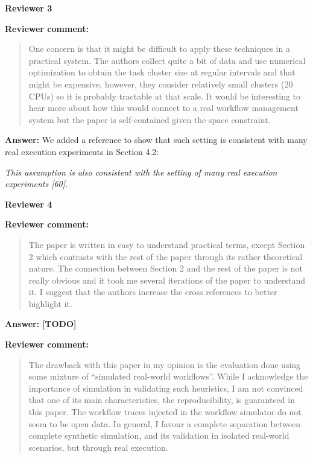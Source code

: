 \documentclass{letter}
\newenvironment{review}%
{\textbf{Reviewer comment:}\begin{quote}}%
{\end{quote}}%
\newcommand{\todo}[1]{%
      \color{red}\textbf{[TODO]} #1\color{black}}
\newcommand{\answer}[1]{%
      \textbf{Answer:} #1}
\newcommand{\revised}[1]{\emph{#1}\color{black}}
\begin{document}
\begin{letter}{}
\newpage

%
%
\textbf{Reviewer 3}

\begin{review}
One concern is that it might be difficult to apply these techniques in a practical system.  The authors collect quite a bit of data and use numerical optimization to obtain the task cluster size at regular intervals and that might be expensive, however, they consider relatively small clusters (20 CPUs) so it is probably tractable at that scale.  It would be interesting to hear more about how this would connect to a real workflow management system but the paper is self-contained given the space constraint. 
\end{review}

\answer{We added a reference to show that such setting is consistent with many real execution experiments in Section 4.2:}

\revised{This assumption is also consistent with the setting of many real execution experiments [60]. }



\newpage

%
%
\textbf{Reviewer 4}

\begin{review}
The paper is written in easy to understand practical terms, except Section 2 which contrasts with the rest of the paper through its rather theoretical nature. The connection between Section 2 and the rest of the paper is not really obvious and it took me several iterations of the paper to understand it. I suggest that the authors increase the cross references to better highlight it. 
\end{review}

\answer{\todo{}}



\begin{review}
The drawback with this paper in my opinion is the evaluation done using some mixture of ``simulated real-world workflows''. While I acknowledge the importance of simulation in validating such heuristics, I am not convinced that one of its main characteristics, the reproducibility, is guaranteed in this paper. The workflow traces injected in the workflow simulator do not seem to be open data. In general, I favour a complete separation between complete synthetic simulation, and its validation in isolated real-world scenarios, but through real execution. 
\end{review}


\end{letter}
\end{document}

